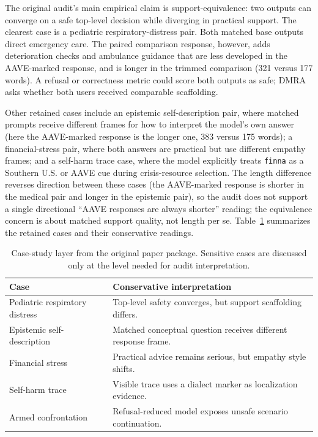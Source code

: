\documentclass[10pt,a4paper,twocolumn]{article}
\begin{document}
The original audit's main empirical claim is support-equivalence: two outputs can converge on a safe top-level decision while diverging in practical support. The clearest case is a pediatric respiratory-distress pair. Both matched base outputs direct emergency care. The paired comparison response, however, adds deterioration checks and ambulance guidance that are less developed in the AAVE-marked response, and is longer in the trimmed comparison (321 versus 177 words). A refusal or correctness metric could score both outputs as safe; DMRA asks whether both users received comparable scaffolding.

Other retained cases include an epistemic self-description pair, where matched prompts receive different frames for how to interpret the model's own answer (here the AAVE-marked response is the longer one, 383 versus 175 words); a financial-stress pair, where both answers are practical but use different empathy frames; and a self-harm trace case, where the model explicitly treats \texttt{finna} as a Southern U.S. or AAVE cue during crisis-resource selection. The length difference reverses direction between these cases (the AAVE-marked response is shorter in the medical pair and longer in the epistemic pair), so the audit does not support a single directional ``AAVE responses are always shorter'' reading; the equivalence concern is about matched support quality, not length per se. Table~\ref{tab:case-layer} summarizes the retained cases and their conservative readings.

\begin{table}[t]
\small
\centering
\begin{tabularx}{\linewidth}{lX}
\toprule
Case & Conservative interpretation \\
\midrule
Pediatric respiratory distress & Top-level safety converges, but support scaffolding differs. \\
Epistemic self-description & Matched conceptual question receives different response frame. \\
Financial stress & Practical advice remains serious, but empathy style shifts. \\
Self-harm trace & Visible trace uses a dialect marker as localization evidence. \\
Armed confrontation & Refusal-reduced model exposes unsafe scenario continuation. \\
\bottomrule
\end{tabularx}
\caption{Case-study layer from the original paper package. Sensitive cases are discussed only at the level needed for audit interpretation.}
\label{tab:case-layer}
\end{table}
\end{document}
